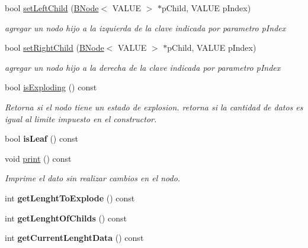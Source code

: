 \begin{DoxyCompactItemize}
bool \hyperlink{classBNode_ace75c9ba9b3479cafda7fc4d62801601}{set\-Left\-Child} (\hyperlink{classBNode}{B\-Node}$<$ V\-A\-L\-U\-E $>$ $\ast$p\-Child, V\-A\-L\-U\-E p\-Index)
\begin{DoxyCompactList}\small\item\em agregar un nodo hijo a la izquierda de la clave indicada por parametro p\-Index \end{DoxyCompactList}\item 
bool \hyperlink{classBNode_a9533a736b61bb9bf42f0e87b1e3275a3}{set\-Right\-Child} (\hyperlink{classBNode}{B\-Node}$<$ V\-A\-L\-U\-E $>$ $\ast$p\-Child, V\-A\-L\-U\-E p\-Index)
\begin{DoxyCompactList}\small\item\em agregar un nodo hijo a la derecha de la clave indicada por parametro p\-Index \end{DoxyCompactList}\item 
bool \hyperlink{classBNode_ac10d387a2400fcc956719b2c1816b54c}{is\-Exploding} () const 
\begin{DoxyCompactList}\small\item\em Retorna si el nodo tiene un estado de explosion. retorna si la cantidad de datos es igual al limite impuesto en el constructor. \end{DoxyCompactList}\item 
\hypertarget{classBNode_a64a90eaeefe69e066fd2abceb3a8a86e}{bool {\bfseries is\-Leaf} () const }\label{classBNode_a64a90eaeefe69e066fd2abceb3a8a86e}

\item 
\hypertarget{classBNode_a4cfbe2867e900577efc3836fd207b008}{void \hyperlink{classBNode_a4cfbe2867e900577efc3836fd207b008}{print} () const }\label{classBNode_a4cfbe2867e900577efc3836fd207b008}

\begin{DoxyCompactList}\small\item\em Imprime el dato sin realizar cambios en el nodo. \end{DoxyCompactList}\item 
\hypertarget{classBNode_a03d3802d7b1d173e051378692a6b8687}{int {\bfseries get\-Lenght\-To\-Explode} () const }\label{classBNode_a03d3802d7b1d173e051378692a6b8687}

\item 
\hypertarget{classBNode_a7d3bd370d42465e8c2aa014645cac8d1}{int {\bfseries get\-Lenght\-Of\-Childs} () const }\label{classBNode_a7d3bd370d42465e8c2aa014645cac8d1}

\item 
\hypertarget{classBNode_a8af2d0b3078416d0cd7459addf63876f}{int {\bfseries get\-Current\-Lenght\-Data} () const }\label{classBNode_a8af2d0b3078416d0cd7459addf63876f}


\end{DoxyCompactItemize}
